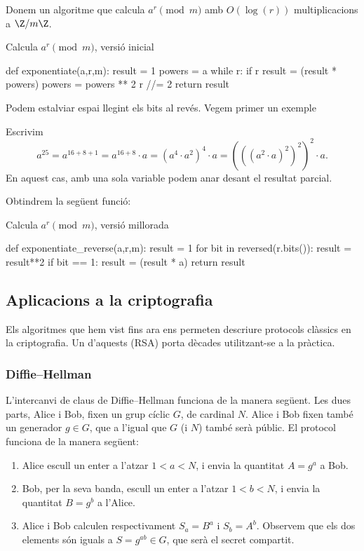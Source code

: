  Donem un algoritme que calcula $a^r\pmod{m}$ amb $O(\log(r))$ multiplicacions a $\Z/m\Z$.
 
 \begin{algo}
 \caption{Calcula $a^r\pmod m$, versió inicial}
\begin{python}
def exponentiate(a,r,m):
    result = 1
    powers = a %
    while r:
        if r %
            result = (result * powers) %
        powers = powers ** 2 %
        r //= 2
    return result
\end{python}
  \end{algo}
  
 Podem estalviar espai llegint els bits al revés. Vegem primer un exemple
 \begin{example}
 Escrivim
 \[
 a^{25} = a^{16+8+1} = a^{16+8}\cdot a = (a^{4}\cdot a^2)^4\cdot a = (((a^2\cdot a)^2)^2)^2\cdot a.
 \]
 En aquest cas, amb una sola variable podem anar desant el resultat parcial.
 \end{example}
 
 Obtindrem la següent funció:
  \begin{algo}
 \caption{Calcula $a^r\pmod m$, versió millorada}
 \begin{python}
def exponentiate_reverse(a,r,m):
    result = 1
    for bit in reversed(r.bits()):
        result = result**2 %
        if bit == 1:
            result = (result * a) %
    return result
 \end{python}
 \end{algo}

\subsection{Aplicacions a la criptografia}
Els algoritmes que hem vist fins ara ens permeten descriure protocols clàssics en la criptografia. Un d'aquests (RSA) porta dècades utilitzant-se a la pràctica.

\subsubsection{Diffie--Hellman}
\label{sec:diffie-hellman}
L'intercanvi de claus de Diffie--Hellman  funciona de la manera següent. Les dues parts, Alice i Bob, fixen un grup cíclic $G$, de cardinal $N$. Alice i Bob fixen també un generador $g\in G$, que a l'igual que $G$ (i $N$) també serà públic. El protocol funciona de la manera següent:
\begin{enumerate}
    \item Alice escull un enter a l'atzar $1<a<N$, i envia la quantitat $A=g^a$ a Bob.
    \item Bob, per la seva banda, escull un enter a l'atzar $1<b<N$, i envia la quantitat $B=g^b$ a l'Alice.
    \item Alice i Bob calculen respectivament $S_a=B^a$ i $S_b=A^b$. Observem que els dos elements són iguals a $S=g^{ab}\in G$, que serà el secret compartit.
\end{enumerate}

